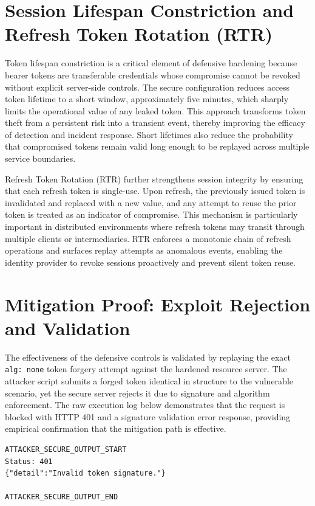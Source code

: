 \documentclass[11pt,a4paper]{report}
\begin{document}
\section{Session Lifespan Constriction and Refresh Token Rotation (RTR)}
\label{sec:rtr}
Token lifespan constriction is a critical element of defensive hardening because bearer tokens are transferable credentials whose compromise cannot be revoked without explicit server-side controls. The secure configuration reduces access token lifetime to a short window, approximately five minutes, which sharply limits the operational value of any leaked token. This approach transforms token theft from a persistent risk into a transient event, thereby improving the efficacy of detection and incident response. Short lifetimes also reduce the probability that compromised tokens remain valid long enough to be replayed across multiple service boundaries.

Refresh Token Rotation (RTR) further strengthens session integrity by ensuring that each refresh token is single-use. Upon refresh, the previously issued token is invalidated and replaced with a new value, and any attempt to reuse the prior token is treated as an indicator of compromise. This mechanism is particularly important in distributed environments where refresh tokens may transit through multiple clients or intermediaries. RTR enforces a monotonic chain of refresh operations and surfaces replay attempts as anomalous events, enabling the identity provider to revoke sessions proactively and prevent silent token reuse.

\section{Mitigation Proof: Exploit Rejection and Validation}
\label{sec:mitigation-proof}
The effectiveness of the defensive controls is validated by replaying the exact \texttt{alg: none} token forgery attempt against the hardened resource server. The attacker script submits a forged token identical in structure to the vulnerable scenario, yet the secure server rejects it due to signature and algorithm enforcement. The raw execution log below demonstrates that the request is blocked with HTTP 401 and a signature validation error response, providing empirical confirmation that the mitigation path is effective.

\begin{lstlisting}[caption={Attacker output against hardened server showing rejection},label={lst:secure-reject}]
ATTACKER_SECURE_OUTPUT_START
Status: 401
{"detail":"Invalid token signature."}

ATTACKER_SECURE_OUTPUT_END
\end{lstlisting}
\end{document}
